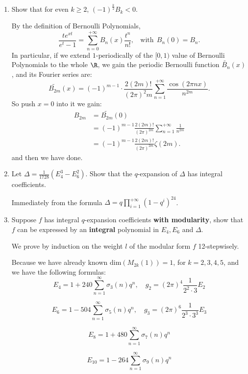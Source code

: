 \begin{enumerate}[1]
    \item Show that for even $k \geq 2$, $(-1)^{\frac{k}{2}} B_k <0$.
\begin{proofc}[解答]
    By the definition of Bernoulli Polynomials, $$\frac{te^{xt}}{e^t-1} = \sum_{n=0}^{+\infty} B_n(x) \frac{t^n}{n!}, \ \ \ \ \text{with}\ \ B_n(0) = B_n.$$
    In particular, if we extend $1$-periodically of the $[0,1)$ value of Bernoulli Polynomials to the whole $\R$, we gain the periodic Bernoulli function $\tilde{B_{n}}(x)$, and its Fourier series are:
    $$\tilde{B_{2m}}(x) = (-1)^{m-1} \cdot \frac{2(2m)!}{(2\pi)^2m} \sum_{n=1}^{+\infty} \frac{\cos(2\pi nx)}{n^{2m}}.$$
    So push $x = 0$ into it we gain:
    \begin{align}
        B_{2m} &= \tilde{B_{2m}}(0) \\
        &= (-1)^{m-1} \frac{2(2m)!}{(2\pi)^{2m}} \sum_{n=1}^{+\infty}\frac{1}{n^{2m}} \\
        &=   (-1)^{m-1} \frac{2(2m)!}{(2\pi)^{2m}} \zeta(2m).
    \end{align}
    and then we have done.
\end{proofc}

    \item Let $\Delta = \frac {1}{1728}(E^3_4 - E^2_6)$. Show that the $q$-expansion of $\Delta$ has integral coefficients.
    \begin{proofc}[解答]
        Immediately from the formula $\Delta = q\prod_{i=1}^{+\infty}(1-q^i)^{24}$.
    \end{proofc}

    \item Suppose $f$ has integral $q$-expansion coefficients \textbf{with modularity}, show that $f$ can be expressed by an \textbf{integral} polynomial in $E_4, E_6$ and $\Delta$. 
    \begin{proofc}[解答]
        We prove by induction on the weight $l$ of the modular form $f$ 12-stepwisely. 

        Because we have already known $\mathrm{dim}(M_{2k}(1)) = 1$, for $k = 2, 3, 4, 5$, and we have the following formulas:
        \[ E_4 = 1 + 240 \sum_{n=1}^{\infty} \sigma_3(n) q^n, \quad g_2 = (2\pi)^4 \frac{1}{2^2\cdot3} E_2 \]

\[ E_6 = 1 - 504 \sum_{n=1}^{\infty} \sigma_5(n) q^n, \quad g_3 = (2\pi)^6 \frac{1}{2^3\cdot3^3} E_3 \]

\[ E_8 = 1 + 480 \sum_{n=1}^{\infty} \sigma_7(n) q^n \]

\[ E_{10} = 1 - 264 \sum_{n=1}^{\infty} \sigma_9(n) q^n \]


\end{proofc}
\end{enumerate}

